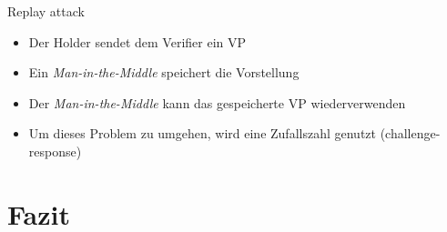 \documentclass[
	german,%
	authorontitle=true,
	]{bfhbeamer}
\begin{document}
\begin{frame}{Replay attack}
    \begin{itemize}
        \item Der Holder sendet dem Verifier ein VP
        \item Ein \textit{Man-in-the-Middle} speichert die Vorstellung
        \item Der \textit{Man-in-the-Middle} kann das gespeicherte VP wiederverwenden
        \item Um dieses Problem zu umgehen, wird eine Zufallszahl genutzt (challenge-response)
    \end{itemize}
\end{frame}


\section{Fazit}
\end{document}
